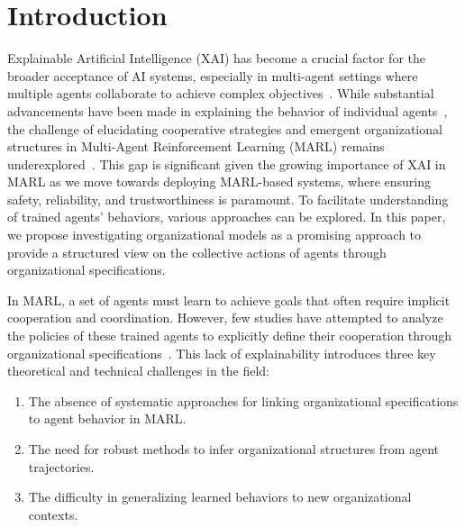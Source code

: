 \documentclass[sn-mathphys-num]{sn-jnl}%
\theoremstyle{thmstyleone}%
\theoremstyle{thmstyletwo}%
\theoremstyle{thmstylethree}%
\begin{document}



\maketitle

\section{Introduction}
\label{sec:intro}

Explainable Artificial Intelligence (XAI) has become a crucial factor for the broader acceptance of AI systems, especially in multi-agent settings where multiple agents collaborate to achieve complex objectives~\citep{doshivelez2017rigorous,gunning2019xai}. While substantial advancements have been made in explaining the behavior of individual agents~\citep{ribeiro2016classifier,lundberg2017unified}, the challenge of elucidating cooperative strategies and emergent organizational structures in Multi-Agent Reinforcement Learning (MARL) remains underexplored~\citep{busoniu2008survey}. This gap is significant given the growing importance of XAI in MARL as we move towards deploying MARL-based systems, where ensuring safety, reliability, and trustworthiness is paramount. To facilitate understanding of trained agents' behaviors, various approaches can be explored. In this paper, we propose investigating organizational models as a promising approach to provide a structured view on the collective actions of agents through organizational specifications.

In MARL, a set of agents must learn to achieve goals that often require implicit cooperation and coordination. However, few studies have attempted to analyze the policies of these trained agents to explicitly define their cooperation through organizational specifications~\citep{albrecht2018survey,perolat2017pool}. This lack of explainability introduces three key theoretical and technical challenges in the field:
\begin{enumerate}
    \item The absence of systematic approaches for linking organizational specifications to agent behavior in MARL.
    \item The need for robust methods to infer organizational structures from agent trajectories.
    \item The difficulty in generalizing learned behaviors to new organizational contexts.
\end{enumerate}
\end{document}
